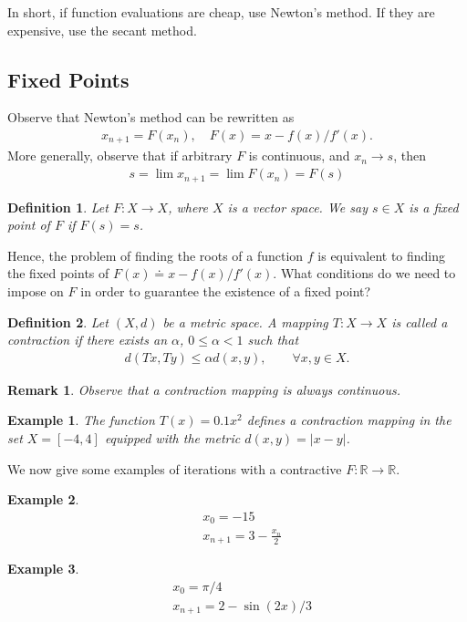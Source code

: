 \documentclass[12pt,reqno]{amsart}
\numberwithin{equation}{section}  %
\newcommand{\rr}{\mathbb{R}}
\newtheorem*{definition}{Definition}
\newtheorem*{remark}{Remark}
\newtheorem*{example}{Example}
\begin{document}
In short, if function evaluations are cheap, use Newton's method. If they are
expensive, use the secant method.
\subsection{Fixed Points}
Observe that Newton's method can be rewritten as 
\begin{align*}
x_{n+1} = F(x_n), \quad F(x) = x - f(x)/f'(x).
\end{align*}
More generally, observe that if arbitrary $F$ is continuous, and
$x_n \to s$, then
\begin{align*}
s = \lim {x_{n+1}} = \lim F(x_n) = F(s)
\end{align*}
\begin{definition}
Let $F: X \to X$, where $X$ is a vector space. We say $s \in X$ is a 
\emph{fixed point} of $F$ if $F(s) = s$.
\end{definition}
Hence, the problem of finding the roots of a function $f$ is equivalent
to finding the fixed points of $F(x) \doteq x - f(x)/f'(x)$.
What conditions do we need to impose on $F$ in order to guarantee
the existence of a fixed point?
\begin{definition}
  Let $\left( X, d \right)$ be a metric space. A mapping $T: X \to X$ is called a
\emph{contraction} if there exists an $\alpha$, $0 \le \alpha <1$ such that
\begin{equation*}
	\begin{split}
		d(Tx, Ty) \le \alpha d(x,y), \qquad \forall x, y \in X.
	\end{split}
\end{equation*}
\end{definition}
\begin{remark}
	Observe that a contraction mapping is always continuous.
\end{remark}
\begin{example}
	The function $T(x) = 0.1x^2$ defines a contraction mapping in the set 
	$X = [-4, 4]$ equipped with the metric $d(x,y) = |x-y|$. 
\end{example}
We now give some examples of iterations with a contractive $F: \rr \to \rr$.
\begin{example}
\begin{align*}
& x_0 = -15
\\
& x_{n+1} = 3 - \frac{x_n}{2}
\end{align*}
\end{example}
\begin{example}
\begin{align*}
& x_0 = \pi/4
\\
& x_{n+1} = 2 - \sin(2x)/3
\end{align*}
\end{example} 
\end{document}
